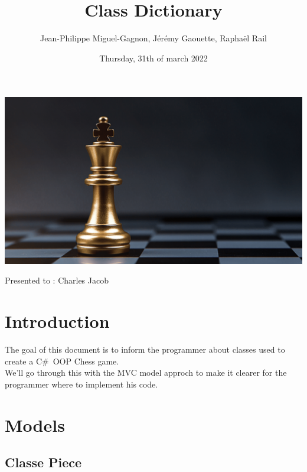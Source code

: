 \documentclass[12pt]{article}
\title{Class Dictionary}
\author{Jean-Philippe Miguel-Gagnon, Jérémy Gaouette, Raphaël Rail}
\date{Thursday, 31th of march 2022}
\begin{document}
\begin{titlepage}
\maketitle
\includegraphics[width=\textwidth]{CHESS}
\begin{center}Presented to : Charles Jacob\end{center}
\end{titlepage}

\tableofcontents

\newpage

\section{Introduction}

The goal of this document is to inform the programmer about
classes used to create a C\#\ OOP Chess game.
\\

We'll go through this with the MVC model approch to make it
clearer for the programmer where to implement his code. 

\newpage

\section{Models}

\subsection{Classe Piece}
\end{document}
